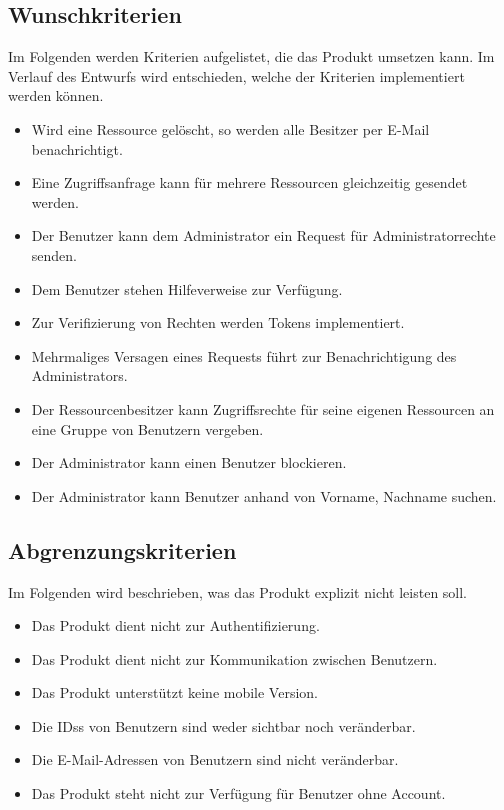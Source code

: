 \documentclass[parskip=full,11pt]{scrartcl}
\begin{document}
\subsection{Wunschkriterien}
Im Folgenden werden Kriterien aufgelistet, die das Produkt umsetzen kann.
Im Verlauf des Entwurfs wird entschieden, welche der Kriterien  implementiert werden können.
\begin{itemize}[itemsep=0pt]
\item Wird eine Ressource gelöscht, so werden alle Besitzer per E-Mail benachrichtigt. 
\item Eine Zugriffsanfrage kann für mehrere Ressourcen gleichzeitig gesendet werden.
\item Der Benutzer kann dem Administrator ein Request für Administratorrechte senden.
\item Dem Benutzer stehen Hilfeverweise zur Verfügung.
\item Zur Verifizierung von Rechten werden \glspl{Token} implementiert.
\item Mehrmaliges Versagen eines Requests führt zur Benachrichtigung des Administrators.
\item Der Ressourcenbesitzer kann Zugriffsrechte für seine eigenen Ressourcen an eine Gruppe von Benutzern vergeben.
\item Der Administrator kann einen Benutzer blockieren.
\item Der Administrator kann Benutzer anhand von Vorname, Nachname suchen.
\end{itemize}
\newpage


\subsection{Abgrenzungskriterien}
Im Folgenden wird beschrieben, was das Produkt explizit nicht leisten soll.
\begin{itemize}[itemsep=0pt]
\item Das Produkt dient nicht zur Authentifizierung.
\item Das Produkt dient nicht zur Kommunikation zwischen Benutzern.
\item Das Produkt unterstützt keine mobile Version.
\item Die \glspl{IDs} von Benutzern sind weder sichtbar noch veränderbar.
\item Die E-Mail-Adressen von Benutzern sind nicht veränderbar.
\item Das Produkt steht nicht zur Verfügung für Benutzer ohne Account.
\end{itemize}
\end{document}
